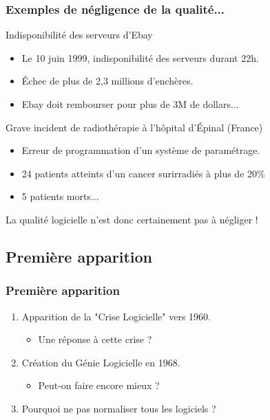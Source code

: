 \documentclass[10pt]{beamer}
\begin{document}
\begin{frame}
\frametitle{Exemples de négligence de la qualité...}

\pause[2] \begin{exampleblock}{ Indisponibilité des serveurs d'Ebay }
     \begin{itemize}
     \item<3->Le 10 juin 1999, indisponibilité des serveurs durant 22h.
     \item<4->\'Echec de plus de 2,3 millions d'enchères.
     \item<5->Ebay doit rembourser pour plus de 3M de dollars...
     \end{itemize}
\end{exampleblock}

\pause[6] \begin{exampleblock}{ Grave incident de radiothérapie à l'hôpital d'\'Epinal (France) }
     \begin{itemize}
     \item<7->Erreur de programmation d'un système de paramétrage.
     \item<8->24 patients atteints d'un cancer surirradiés à plus de 20\%
     \item<9->5 patients morts...
     \end{itemize}
\end{exampleblock}

\pause[10] \begin{alertblock}{}
 \alert{La qualité logicielle n'est donc certainement pas à négliger !}
\end{alertblock}

\end{frame}


\subsection{Première apparition}

\begin{frame}
\frametitle{Première apparition}

\begin{enumerate}
\pause[2] \item Apparition de la "Crise Logicielle" vers 1960.
	\begin{itemize}
	\item<3->\smallskip Une réponse à cette crise ?
	\end{itemize}
\item<4-> \bigskip Création du Génie Logicielle en 1968.
	\begin{itemize}
	\item<5->\smallskip Peut-on faire encore mieux ?
	\end{itemize}
\item<6->\bigskip Pourquoi ne pas normaliser tous les logiciels ?
\end{enumerate}

\end{frame}
\end{document}
